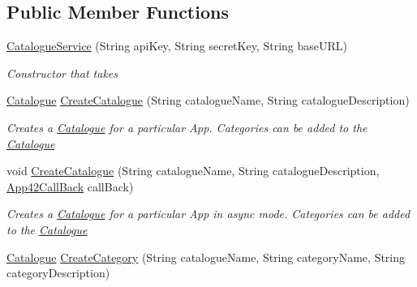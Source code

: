 \subsection*{Public Member Functions}
\begin{DoxyCompactItemize}
\item 
\hyperlink{classcom_1_1shephertz_1_1app42_1_1paas_1_1sdk_1_1csharp_1_1shopping_1_1_catalogue_service_ad9526bb4c30838d034bddf95a90b333d}{Catalogue\+Service} (String api\+Key, String secret\+Key, String base\+U\+R\+L)
\begin{DoxyCompactList}\small\item\em Constructor that takes \end{DoxyCompactList}\item 
\hyperlink{classcom_1_1shephertz_1_1app42_1_1paas_1_1sdk_1_1csharp_1_1shopping_1_1_catalogue}{Catalogue} \hyperlink{classcom_1_1shephertz_1_1app42_1_1paas_1_1sdk_1_1csharp_1_1shopping_1_1_catalogue_service_a5f0a8393274f2e91be5afb036d8f70db}{Create\+Catalogue} (String catalogue\+Name, String catalogue\+Description)
\begin{DoxyCompactList}\small\item\em Creates a \hyperlink{classcom_1_1shephertz_1_1app42_1_1paas_1_1sdk_1_1csharp_1_1shopping_1_1_catalogue}{Catalogue} for a particular App. Categories can be added to the \hyperlink{classcom_1_1shephertz_1_1app42_1_1paas_1_1sdk_1_1csharp_1_1shopping_1_1_catalogue}{Catalogue} \end{DoxyCompactList}\item 
void \hyperlink{classcom_1_1shephertz_1_1app42_1_1paas_1_1sdk_1_1csharp_1_1shopping_1_1_catalogue_service_a80387fa0825d70aab0a8e0d61a3243f8}{Create\+Catalogue} (String catalogue\+Name, String catalogue\+Description, \hyperlink{interfacecom_1_1shephertz_1_1app42_1_1paas_1_1sdk_1_1csharp_1_1_app42_call_back}{App42\+Call\+Back} call\+Back)
\begin{DoxyCompactList}\small\item\em Creates a \hyperlink{classcom_1_1shephertz_1_1app42_1_1paas_1_1sdk_1_1csharp_1_1shopping_1_1_catalogue}{Catalogue} for a particular App in async mode. Categories can be added to the \hyperlink{classcom_1_1shephertz_1_1app42_1_1paas_1_1sdk_1_1csharp_1_1shopping_1_1_catalogue}{Catalogue} \end{DoxyCompactList}\item 
\hyperlink{classcom_1_1shephertz_1_1app42_1_1paas_1_1sdk_1_1csharp_1_1shopping_1_1_catalogue}{Catalogue} \hyperlink{classcom_1_1shephertz_1_1app42_1_1paas_1_1sdk_1_1csharp_1_1shopping_1_1_catalogue_service_a8fabc644a0e1f44981475aae7b91c3f7}{Create\+Category} (String catalogue\+Name, String category\+Name, String category\+Description)

\end{DoxyCompactItemize}
